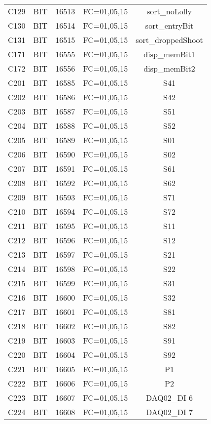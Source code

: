 \begin{center}
\begin{longtable}[c]{ |c|c|c|c|c| }
        C129	&	BIT	&	16513	&	FC=01,05,15	&	sort\_noLolly\\
        C130	&	BIT	&	16514	&	FC=01,05,15	&	sort\_entryBit\\
        C131	&	BIT	&	16515	&	FC=01,05,15	&	sort\_droppedShoot\\
        C171	&	BIT	&	16555	&	FC=01,05,15	&	disp\_memBit1\\
        C172	&	BIT	&	16556	&	FC=01,05,15	&	disp\_memBit2\\
        C201	&	BIT	&	16585	&	FC=01,05,15	&	S41\\
        C202	&	BIT	&	16586	&	FC=01,05,15	&	S42\\
        C203	&	BIT	&	16587	&	FC=01,05,15	&	S51\\
        C204	&	BIT	&	16588	&	FC=01,05,15	&	S52\\
        C205	&	BIT	&	16589	&	FC=01,05,15	&	S01\\
        C206	&	BIT	&	16590	&	FC=01,05,15	&	S02\\
        C207	&	BIT	&	16591	&	FC=01,05,15	&	S61\\
        C208	&	BIT	&	16592	&	FC=01,05,15	&	S62\\
        C209	&	BIT	&	16593	&	FC=01,05,15	&	S71\\
        C210	&	BIT	&	16594	&	FC=01,05,15	&	S72\\
        C211	&	BIT	&	16595	&	FC=01,05,15	&	S11\\
        C212	&	BIT	&	16596	&	FC=01,05,15	&	S12\\
        C213	&	BIT	&	16597	&	FC=01,05,15	&	S21\\
        C214	&	BIT	&	16598	&	FC=01,05,15	&	S22\\
        C215	&	BIT	&	16599	&	FC=01,05,15	&	S31\\
        C216	&	BIT	&	16600	&	FC=01,05,15	&	S32\\
        C217	&	BIT	&	16601	&	FC=01,05,15	&	S81\\
        C218	&	BIT	&	16602	&	FC=01,05,15	&	S82\\
        C219	&	BIT	&	16603	&	FC=01,05,15	&	S91\\
        C220	&	BIT	&	16604	&	FC=01,05,15	&	S92\\
        C221	&	BIT	&	16605	&	FC=01,05,15	&	P1\\
        C222	&	BIT	&	16606	&	FC=01,05,15	&	P2\\
        C223	&	BIT	&	16607	&	FC=01,05,15	&	DAQ02\_DI 6\\
        C224	&	BIT	&	16608	&	FC=01,05,15	&	DAQ02\_DI 7\\

\end{longtable}
\end{center}
